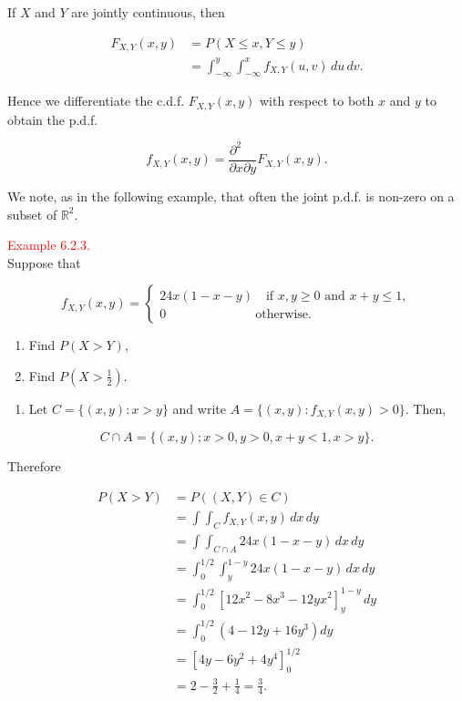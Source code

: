 \documentclass[
]{book}
\providecommand{\tightlist}{%
  \setlength{\itemsep}{0pt}\setlength{\parskip}{0pt}}
\begin{document}
If \(X\) and \(Y\) are jointly continuous, then

\begin{align*}
F_{X,Y}(x,y) &= P(X \leq x, Y \leq y) \\
&= \int_{-\infty}^y \int_{-\infty}^x f_{X,Y}(u,v) \,du \,dv.
\end{align*}

Hence we differentiate the c.d.f. \(F_{X,Y}(x,y)\) with respect to both \(x\) and \(y\) to obtain the p.d.f.

\[f_{X,Y}(x,y) = \frac{ \partial^2 \; \; \;\;} {\partial x \partial y} F_{X,Y}(x,y).\]

We note, as in the following example, that often the joint p.d.f. is non-zero on a subset of \(\mathbb{R}^2\).

\hypertarget{jointdis:ex:joint_density_function_ex}{}
\textcolor{red}{Example 6.2.3.}\\
Suppose that

\[f_{X,Y}(x,y) = \begin{cases}
24x(1-x-y) \quad \text{if } x,y \geq 0 \text{ and } x+y \leq 1, \\
0 \qquad \qquad \qquad \quad \text{otherwise.}
\end{cases}\]

\begin{enumerate}
\def\labelenumi{(\alph{enumi})}
\tightlist
\item
  Find \(P(X>Y)\),\\
\item
  Find \(P(X>\frac{1}{2})\).\\
\end{enumerate}

\hypertarget{jointdis:ex:joint_density_function_sol}{}
\begin{enumerate}
\def\labelenumi{(\alph{enumi})}
\tightlist
\item
  Let \(C = \{ (x,y): x>y \}\) and write \(A=\{ (x,y):f_{X,Y}(x,y)>0\}\). Then,
\end{enumerate}

\[ C \cap A = \{ (x,y); x>0, y>0, x+y<1, x>y \}.\]

\hfill\break

Therefore

\begin{align*}
P(X>Y) &= P((X,Y) \in C) \\
&= \int\int_C f_{X,Y}(x,y) \,dx \,dy \\
&= \int\int_{C \cap A} 24x(1-x-y) \,dx \,dy \\
&= \int_0^{1/2} \int_y^{1-y} 24x(1-x-y) \,dx \,dy \\
&= \int_0^{1/2} \left[ 12x^2 - 8x^3 - 12yx^2 \right]_y^{1-y} \,dy \\
&= \int_0^{1/2} \left( 4 - 12y + 16y^3 \right) dy \\
&= \left[ 4y - 6y^2 + 4y^4 \right]_0^{1/2} \\
&= 2 - \frac{3}{2} + \frac{1}{4} = \frac{3}{4}.
\end{align*}
\end{document}
